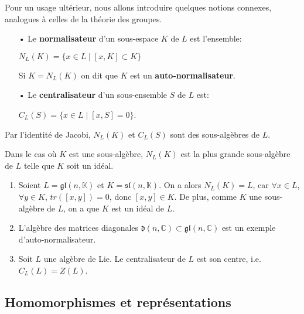 \documentclass[a4paper,openany,12pt]{report}
\newcommand{\KK}{\mathbb{K}}
\newcommand{\CC}{\mathbb{C}}
\newcommand{\gl}{\mathfrak{gl}}
\newcommand{\ssl}{\mathfrak{sl}}
\newcommand{\dd}{\mathfrak{d}}
\theoremstyle{break}
{\theorembodyfont{\upshape}
\newtheorem*{rmq}{Remarque :}
\newtheorem*{prv}{Preuve :}
\newtheorem*{ex}{Exemples :}
\newtheorem*{exe}{Exemple : }
\newtheorem*{nota}{Notation :}
\newtheorem*{dem}{D\'emonstration :}}
\begin{document}
Pour un usage ultérieur, nous allons introduire quelques notions connexes, analogues à celles de la théorie des groupes.

\begin{df}
\begin{itemize}

\item[•] Le \textbf{normalisateur} d'un sous-espace $K$ de $L$ est l'ensemble:  
 \begin{center}
$ N_{L}(K)=\{x \in L \mid [x,K] \subset K \} $ 
 \end{center}
Si $K = N_{L}(K)$ on dit que $K$ est un \textbf{auto-normalisateur}.

\item[•] Le \textbf{centralisateur} d'un sous-ensemble $S$ de $L$ est:
\begin{center}
$C_{L}(S) = \{x \in L \mid [x,S]=0\}$.
\end{center} 
\end{itemize}
\end{df}

\begin{rmq} 
\quad Par l’identité de Jacobi, $N_L(K)$ et $C_L(S)$ sont des sous-algèbres de $L$.

Dans le cas où $K$ est une sous-algèbre, $N_{L}(K)$ est la plus grande sous-algèbre de $L$ telle que $K$ soit un idéal.
\end{rmq}

\begin{ex}
\begin{enumerate}
\item Soient $L= \gl(n,\KK)$ et $K = \ssl(n,\KK)$. On a alors $N_L(K) = L$, car $\forall x \in L$, $\forall y \in K$, $tr([x,y]) = 0$, donc $[x,y] \in K$. De plus, comme $K$ une sous-algèbre de $L$, on a que $K$ est un idéal de $L$.

\item L'algèbre des matrices diagonales $ \dd(n,\CC) \subset \gl(n,\CC)$ est un exemple d'auto-normalisateur.

\item Soit $L$ une algèbre de Lie. Le centralisateur de $L$ est son centre, i.e. $C_L(L)=Z(L)$.

\end{enumerate}
\end{ex}

\subsection{Homomorphismes et représentations}
\end{document}
